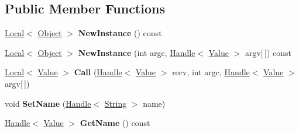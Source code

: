 \subsection*{Public Member Functions}
\begin{DoxyCompactItemize}
\item 
\hypertarget{classv8_1_1_function_a2bbac81200b840cbd484679aaa5b03d4}{}\hyperlink{classv8_1_1_local}{Local}$<$ \hyperlink{classv8_1_1_object}{Object} $>$ {\bfseries New\+Instance} () const \label{classv8_1_1_function_a2bbac81200b840cbd484679aaa5b03d4}

\item 
\hypertarget{classv8_1_1_function_a1261371c01bf18be5564f290af22e9d9}{}\hyperlink{classv8_1_1_local}{Local}$<$ \hyperlink{classv8_1_1_object}{Object} $>$ {\bfseries New\+Instance} (int argc, \hyperlink{classv8_1_1_handle}{Handle}$<$ \hyperlink{classv8_1_1_value}{Value} $>$ argv\mbox{[}$\,$\mbox{]}) const \label{classv8_1_1_function_a1261371c01bf18be5564f290af22e9d9}

\item 
\hypertarget{classv8_1_1_function_a09b1a95dcd397bfad9d39942605dc3ce}{}\hyperlink{classv8_1_1_local}{Local}$<$ \hyperlink{classv8_1_1_value}{Value} $>$ {\bfseries Call} (\hyperlink{classv8_1_1_handle}{Handle}$<$ \hyperlink{classv8_1_1_value}{Value} $>$ recv, int argc, \hyperlink{classv8_1_1_handle}{Handle}$<$ \hyperlink{classv8_1_1_value}{Value} $>$ argv\mbox{[}$\,$\mbox{]})\label{classv8_1_1_function_a09b1a95dcd397bfad9d39942605dc3ce}

\item 
\hypertarget{classv8_1_1_function_a5e244ce13d6f30ffa69f520126ada795}{}void {\bfseries Set\+Name} (\hyperlink{classv8_1_1_handle}{Handle}$<$ \hyperlink{classv8_1_1_string}{String} $>$ name)\label{classv8_1_1_function_a5e244ce13d6f30ffa69f520126ada795}

\item 
\hypertarget{classv8_1_1_function_adbbf95a036859381c06af3d05cd74b07}{}\hyperlink{classv8_1_1_handle}{Handle}$<$ \hyperlink{classv8_1_1_value}{Value} $>$ {\bfseries Get\+Name} () const \label{classv8_1_1_function_adbbf95a036859381c06af3d05cd74b07}


\end{DoxyCompactItemize}
